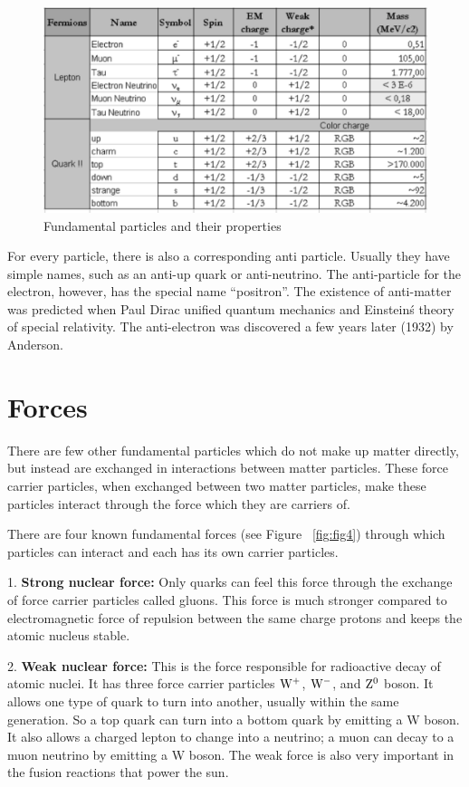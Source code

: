 \begin{figure}[h]
\centering\includegraphics[scale=0.5]{./ElementaryParticles/Pictures/fig5.pdf}
\caption{Fundamental particles and their properties}
\label{fig:fig5}
\end{figure}


For every particle, there is also a corresponding anti particle.  Usually they have simple names, such as an anti-up quark or anti-neutrino.  The anti-particle for the electron, however, has the special name “positron”.  The existence of anti-matter was predicted when Paul Dirac unified quantum mechanics and Einstein\'s theory of special relativity.  The anti-electron was discovered a few years later (1932) by Anderson.

\section{Forces} 
There are few other fundamental particles which do not make up matter directly, but instead are exchanged in interactions between matter particles. These force carrier particles, when exchanged between two matter particles, make these particles interact through the force which they are carriers of. 

There are four known fundamental forces (see Figure ~\ref{fig:fig4})
through which particles can interact and each has its own carrier particles. 

1.	{\bf Strong nuclear force:} 
Only quarks can feel this force through the exchange of force carrier particles called gluons. This force is much stronger compared to electromagnetic force of repulsion between the same charge protons and keeps the atomic nucleus stable.


2.	{\bf Weak nuclear force:}
This is the force responsible for radioactive decay of atomic nuclei.  It has three force carrier particles $\rm{W^+}$, $\rm{W^-}$, and $\rm{Z^0}$ boson. It allows one type of quark to turn into another, usually within the same generation.  So a top quark can turn into a bottom quark by emitting a W boson.  It also allows a charged lepton to change into a neutrino; a muon can decay to a muon neutrino by emitting a W boson.  The weak force is also very important in the fusion reactions that power the sun.

